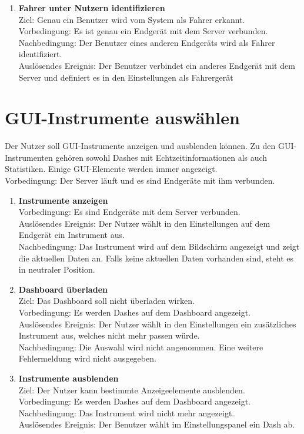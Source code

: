 \documentclass[pflichtenheft.tex]{subfiles}
\begin{document}
\begin{enumerate}
		\item{\textbf{Fahrer unter Nutzern identifizieren}} \label{driver2}
		\\ Ziel: Genau ein Benutzer wird vom System als Fahrer erkannt.  \\
		Vorbedingung: Es ist genau ein Endgerät mit dem Server verbunden.\\
		Nachbedingung: Der Benutzer eines anderen Endgeräts wird als Fahrer identifiziert. \\
		Auslösendes Ereignis: Der Benutzer verbindet ein anderes Endgerät mit dem Server und definiert es in den Einstellungen als Fahrergerät

		\setcounter{enumTemp}{\value{enumi}}
		

	\end{enumerate}
	
	\section{GUI-Instrumente auswählen}
	Der Nutzer soll GUI-Instrumente anzeigen und ausblenden können. Zu den GUI-Instrumenten gehören sowohl Dashes mit Echtzeitinformationen als auch Statistiken. Einige GUI-Elemente werden immer angezeigt.\\
	Vorbedingung: Der Server läuft und es sind Endgeräte mit ihm verbunden.
	
	\begin{enumerate}
	\setcounter{enumi}{\value{enumTemp}}
		\item{\textbf{Instrumente anzeigen}} \\Vorbedingung: Es sind Endgeräte mit dem Server verbunden.\\ Auslösendes Ereignis: Der Nutzer wählt in den Einstellungen auf dem Endgerät ein Instrument aus.\\ Nachbedingung: Das Instrument wird auf dem Bildschirm angezeigt und zeigt die aktuellen Daten an. Falls keine aktuellen Daten vorhanden sind, steht es in neutraler Position.
		\item{\textbf{Dashboard überladen}} \\Ziel: Das Dashboard soll nicht überladen wirken.\\
		Vorbedingung: Es werden Dashes auf dem Dashboard angezeigt. \\Auslösendes Ereignis: Der Nutzer wählt in den Einstellungen ein zusätzliches Instrument aus, welches nicht mehr passen würde.\\
		Nachbedingung: Die Auswahl wird nicht angenommen. Eine weitere Fehlermeldung wird nicht ausgegeben.
		\item{\textbf{Instrumente ausblenden}} \\
		Ziel: Der Nutzer kann bestimmte Anzeigeelemente ausblenden.\\
		Vorbedingung: Es werden Dashes auf dem Dashboard angezeigt.\\
		Nachbedingung: Das Instrument wird nicht mehr angezeigt.\\
		Auslösendes Ereignis: Der Benutzer wählt im Einstellungspanel ein Dash ab.
		\setcounter{enumTemp}{\value{enumi}}
	\end{enumerate} 
	
\end{document}
